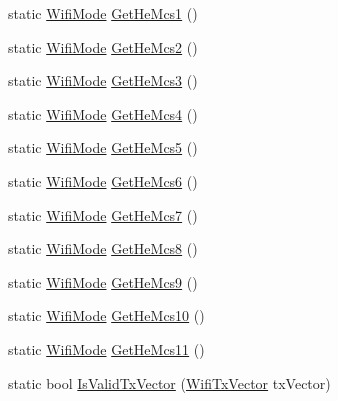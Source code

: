 \begin{DoxyCompactItemize}
static \hyperlink{classns3_1_1WifiMode}{Wifi\+Mode} \hyperlink{classns3_1_1WifiPhy_abba9c5cbc94f1f95a0182a383c0f9a1a}{Get\+He\+Mcs1} ()
\item 
static \hyperlink{classns3_1_1WifiMode}{Wifi\+Mode} \hyperlink{classns3_1_1WifiPhy_a6c92d5a60cf608d311b043c191261803}{Get\+He\+Mcs2} ()
\item 
static \hyperlink{classns3_1_1WifiMode}{Wifi\+Mode} \hyperlink{classns3_1_1WifiPhy_a8dadb22ce1e9f081a602dcc41b606e95}{Get\+He\+Mcs3} ()
\item 
static \hyperlink{classns3_1_1WifiMode}{Wifi\+Mode} \hyperlink{classns3_1_1WifiPhy_a80c8ac4faa7043b42b883ccacc1c3eec}{Get\+He\+Mcs4} ()
\item 
static \hyperlink{classns3_1_1WifiMode}{Wifi\+Mode} \hyperlink{classns3_1_1WifiPhy_a351b1aaf23c3854c453e6f4c5232857a}{Get\+He\+Mcs5} ()
\item 
static \hyperlink{classns3_1_1WifiMode}{Wifi\+Mode} \hyperlink{classns3_1_1WifiPhy_a90aedf7f42b6e3d02b5621e4dcad8adf}{Get\+He\+Mcs6} ()
\item 
static \hyperlink{classns3_1_1WifiMode}{Wifi\+Mode} \hyperlink{classns3_1_1WifiPhy_a6fb0a12105608fd43c813f914e621b49}{Get\+He\+Mcs7} ()
\item 
static \hyperlink{classns3_1_1WifiMode}{Wifi\+Mode} \hyperlink{classns3_1_1WifiPhy_ad90ca59ec933cc5d31381f2a198db6d0}{Get\+He\+Mcs8} ()
\item 
static \hyperlink{classns3_1_1WifiMode}{Wifi\+Mode} \hyperlink{classns3_1_1WifiPhy_a4d94bd283f2b034595fb1add2d57339c}{Get\+He\+Mcs9} ()
\item 
static \hyperlink{classns3_1_1WifiMode}{Wifi\+Mode} \hyperlink{classns3_1_1WifiPhy_aebd346d53abef108a427b6fdc8b7e76b}{Get\+He\+Mcs10} ()
\item 
static \hyperlink{classns3_1_1WifiMode}{Wifi\+Mode} \hyperlink{classns3_1_1WifiPhy_abd100bfd5ef335f48b294cd5ea3b67a4}{Get\+He\+Mcs11} ()
\item 
static bool \hyperlink{classns3_1_1WifiPhy_a2df962f7fd9468b514ea16d5fbed97f6}{Is\+Valid\+Tx\+Vector} (\hyperlink{classns3_1_1WifiTxVector}{Wifi\+Tx\+Vector} tx\+Vector)
\end{DoxyCompactItemize}
